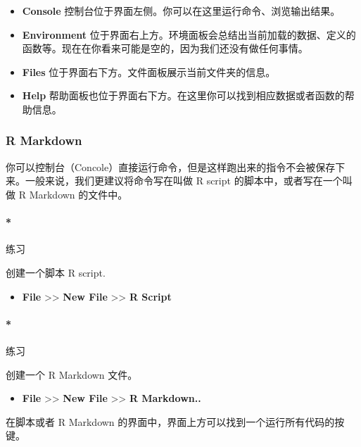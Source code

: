\documentclass[]{ctexbook}
\providecommand{\tightlist}{%
  \setlength{\itemsep}{0pt}\setlength{\parskip}{0pt}}
\let\oldparagraph\paragraph
\renewcommand{\paragraph}[1]{\oldparagraph{#1}\mbox{}}
\begin{document}
\begin{itemize}
\tightlist
\item
  \textbf{Console} 控制台位于界面左侧。你可以在这里运行命令、浏览输出结果。
\item
  \textbf{Environment} 位于界面右上方。环境面板会总结出当前加载的数据、定义的函数等。现在在你看来可能是空的，因为我们还没有做任何事情。
\item
  \textbf{Files} 位于界面右下方。文件面板展示当前文件夹的信息。
\item
  \textbf{Help} 帮助面板也位于界面右下方。在这里你可以找到相应数据或者函数的帮助信息。
\end{itemize}

\hypertarget{r-markdown}{%
\subsubsection{R Markdown}\label{r-markdown}}

你可以控制台（Concole）直接运行命令，但是这样跑出来的指令不会被保存下来。一般来说，我们更建议将命令写在叫做 R script 的脚本中，或者写在一个叫做 R Markdown 的文件中。

\hypertarget{ux7ec3ux4e60-1}{%
\paragraph*{练习}\label{ux7ec3ux4e60-1}}

创建一个脚本 R script.

\begin{itemize}
\tightlist
\item
  \textbf{File} \textgreater\textgreater{} \textbf{New File} \textgreater\textgreater{} \textbf{R Script}
\end{itemize}

\hypertarget{ux7ec3ux4e60-2}{%
\paragraph*{练习}\label{ux7ec3ux4e60-2}}

创建一个 R Markdown 文件。

\begin{itemize}
\tightlist
\item
  \textbf{File} \textgreater\textgreater{} \textbf{New File} \textgreater\textgreater{} \textbf{R Markdown..}
\end{itemize}

在脚本或者 R Markdown 的界面中，界面上方可以找到一个运行所有代码的按键。
\end{document}
